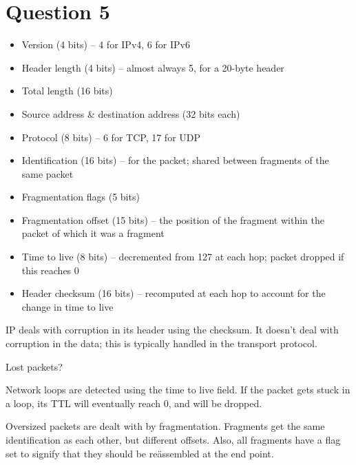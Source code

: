 \documentclass{article}
\begin{document}
\section*{Question 5}
\begin{itemize}
  \item Version (4 bits) -- 4 for IPv4, 6 for IPv6
  \item Header length (4 bits) -- almost always 5, for a 20-byte header
  \item Total length (16 bits)
  \item Source address \& destination address (32 bits each)
  \item Protocol (8 bits) -- 6 for TCP, 17 for UDP
  \item Identification (16 bits) -- for the packet; shared between fragments of the same packet
  \item Fragmentation flags (5 bits)
  \item Fragmentation offset (15 bits) -- the position of the fragment within the packet of which it was a fragment
  \item Time to live (8 bits) -- decremented from 127 at each hop; packet dropped if this reaches 0
  \item Header checksum (16 bits) -- recomputed at each hop to account for the change in time to live
\end{itemize}

IP deals with corruption in its header using the checksum. It doesn't deal with corruption in the data; this is typically handled in the transport protocol.

Lost packets?

Network loops are detected using the time to live field. If the packet gets stuck in a loop, its TTL will eventually reach 0, and will be dropped.

Oversized packets are dealt with by fragmentation. Fragments get the same identification as each other, but different offsets. Also, all fragments have a flag set to signify that they should be re\"assembled at the end point.
\end{document}
